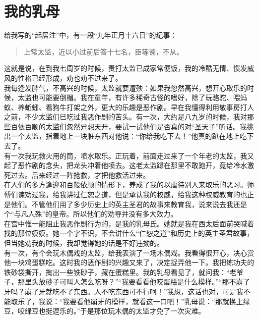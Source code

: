 \fancyhead[RO]{} %
\fancyhead[LE]{} %
\chapter*{我的乳母}
\thispagestyle{empty}
给我写的“起居注”中，有一段“九年正月十六日”的纪事：\\

\begin{quote}
	上常太监，近以小过前后答十七名，臣等谏，不从。\\
\end{quote}

这就是说，在到我七周岁的时候，责打太监已成家常便饭，我的冷酷无情、惯发威风的性格已经形成，劝也劝不过来了。\\

我每逢发脾气，不高兴的时候，太监就要遭殃：如果我忽然高兴，想开心取乐的时候，太监也可能要倒楣。我在童年，有许多稀奇古怪的嗜好，除了玩骆驼、喂蚂蚁、养蚯蚓、看狗牛打架之外，更大的乐趣是恶作剧。早在我懂得利用敬事房打人之前，不少太监们已吃过我恶作剧的苦头。有一次，大约是八九岁的时候，我对那些百依百顺的太监们忽然异想天开，要试一试他们是否真的对“圣天子”听话。我挑出一个太监，指着地上一块脏东西对他说：“你给我吃下去！”他真的趴在地上吃下去了。\\

有一次我玩救火用的筒，喷水取乐。正玩着，前面走过来了一个年老的太监，我又起了恶作剧的念头，把龙头冲着他喷去。这老太监蹲在那里不敢跑开，竟给冷水激死过去。后来经过一阵抢救，才把他救活过来。\\

在人们的多方逢迎和百般依顺的情形下，养成了我的以虐待别人来取乐的恶习。师傅们谏劝过我，给我讲过仁恕之道，但是承认我的权威，给我这种权威教育的也正是他们。不管他们用了多少历史上的英主圣君的故事来教育我，说来说去我还是个“与凡人殊”的皇帝。所以他们的劝导并没有多大效力。\\

在宫中惟一能阻止我恶作剧行为的，是我的乳母氏。她就是我在西太后面前哭喊着找的那位嫫嫫。她一个字不识，不会讲什么“仁恕之道”和历史上的英主圣君故事，但当她劝我的时候，我却觉得她的话是不好违拗的。\\

有一次，有个会玩木偶戏的太监，给我表演了一场木偶戏。我看得很开心，决心赏他一块鸡蛋糕吃。这时我的恶作剧的兴趣又来了，决定捉弄他一下。我把练功夫的铁砂袋撕开，掏出一些铁砂子，藏在蛋糕里。我的乳母看见了，就问我：“老爷子，那里头放砂子可叫人怎么吃呀？”“我要看看他咬蛋糕是什么模样。”“那不崩了牙吗？崩了牙就吃不了东西。人不吃东西可不行呵！”我想，这话也对，可是我不能取乐了，我说：“我要看他崩牙的模样，就看这一口吧！”乳母说：“那就换上绿豆，咬绿豆也挺逗乐的。”于是那位玩木偶的太监才免了一次灾难。\\

